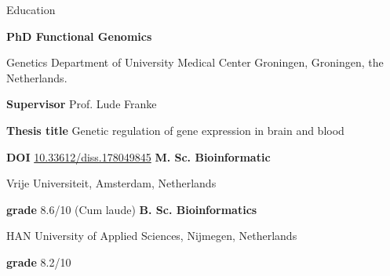 \begin{rubric}{Education}

%
	\textbf{PhD Functional Genomics} \par
	Genetics Department of University Medical Center Groningen, Groningen, the Netherlands. \par
	\textbf{Supervisor} Prof. Lude Franke\par
	\textbf{Thesis title} Genetic regulation of gene expression in brain and blood \par
	\textbf{DOI} \url{10.33612/diss.178049845}
%
%
	\textbf{M. Sc. Bioinformatic} \par
	Vrije Universiteit, Amsterdam, Netherlands \par
	\textbf{grade} 8.6/10 (Cum laude)
%
%
	\textbf{B. Sc. Bioinformatics} \par
	HAN University of Applied Sciences, Nijmegen, Netherlands \par
	\textbf{grade} 8.2/10
%
\end{rubric}

